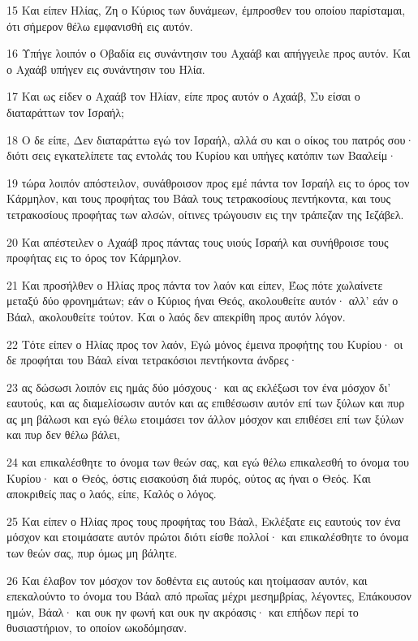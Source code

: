 \par 15 Και είπεν Ηλίας, Ζη ο Κύριος των δυνάμεων, έμπροσθεν του οποίου παρίσταμαι, ότι σήμερον θέλω εμφανισθή εις αυτόν.
\par 16 Υπήγε λοιπόν ο Οβαδία εις συνάντησιν του Αχαάβ και απήγγειλε προς αυτόν. Και ο Αχαάβ υπήγεν εις συνάντησιν του Ηλία.
\par 17 Και ως είδεν ο Αχαάβ τον Ηλίαν, είπε προς αυτόν ο Αχαάβ, Συ είσαι ο διαταράττων τον Ισραήλ;
\par 18 Ο δε είπε, Δεν διαταράττω εγώ τον Ισραήλ, αλλά συ και ο οίκος του πατρός σου· διότι σεις εγκατελίπετε τας εντολάς του Κυρίου και υπήγες κατόπιν των Βααλείμ·
\par 19 τώρα λοιπόν απόστειλον, συνάθροισον προς εμέ πάντα τον Ισραήλ εις το όρος τον Κάρμηλον, και τους προφήτας του Βάαλ τους τετρακοσίους πεντήκοντα, και τους τετρακοσίους προφήτας των αλσών, οίτινες τρώγουσιν εις την τράπεζαν της Ιεζάβελ.
\par 20 Και απέστειλεν ο Αχαάβ προς πάντας τους υιούς Ισραήλ και συνήθροισε τους προφήτας εις το όρος τον Κάρμηλον.
\par 21 Και προσήλθεν ο Ηλίας προς πάντα τον λαόν και είπεν, Έως πότε χωλαίνετε μεταξύ δύο φρονημάτων; εάν ο Κύριος ήναι Θεός, ακολουθείτε αυτόν· αλλ' εάν ο Βάαλ, ακολουθείτε τούτον. Και ο λαός δεν απεκρίθη προς αυτόν λόγον.
\par 22 Τότε είπεν ο Ηλίας προς τον λαόν, Εγώ μόνος έμεινα προφήτης του Κυρίου· οι δε προφήται του Βάαλ είναι τετρακόσιοι πεντήκοντα άνδρες·
\par 23 ας δώσωσι λοιπόν εις ημάς δύο μόσχους· και ας εκλέξωσι τον ένα μόσχον δι' εαυτούς, και ας διαμελίσωσιν αυτόν και ας επιθέσωσιν αυτόν επί των ξύλων και πυρ ας μη βάλωσι και εγώ θέλω ετοιμάσει τον άλλον μόσχον και επιθέσει επί των ξύλων και πυρ δεν θέλω βάλει,
\par 24 και επικαλέσθητε το όνομα των θεών σας, και εγώ θέλω επικαλεσθή το όνομα του Κυρίου· και ο Θεός, όστις εισακούση διά πυρός, ούτος ας ήναι ο Θεός. Και αποκριθείς πας ο λαός, είπε, Καλός ο λόγος.
\par 25 Και είπεν ο Ηλίας προς τους προφήτας του Βάαλ, Εκλέξατε εις εαυτούς τον ένα μόσχον και ετοιμάσατε αυτόν πρώτοι διότι είσθε πολλοί· και επικαλέσθητε το όνομα των θεών σας, πυρ όμως μη βάλητε.
\par 26 Και έλαβον τον μόσχον τον δοθέντα εις αυτούς και ητοίμασαν αυτόν, και επεκαλούντο το όνομα του Βάαλ από πρωΐας μέχρι μεσημβρίας, λέγοντες, Επάκουσον ημών, Βάαλ· και ουκ ην φωνή και ουκ ην ακρόασις· και επήδων περί το θυσιαστήριον, το οποίον ωκοδόμησαν.
